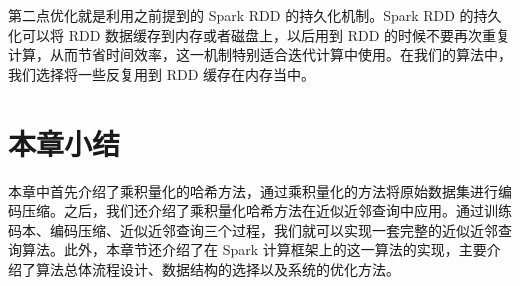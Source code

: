 第二点优化就是利用之前提到的 Spark RDD 的持久化机制。Spark RDD 的持久化可以将 RDD 数据缓存到内存或者磁盘上，以后用到 RDD 的时候不要再次重复计算，从而节省时间效率，这一机制特别适合迭代计算中使用。在我们的算法中，我们选择将一些反复用到 RDD 缓存在内存当中。
\section{本章小结}
本章中首先介绍了乘积量化的哈希方法，通过乘积量化的方法将原始数据集进行编码压缩。之后，我们还介绍了乘积量化哈希方法在近似近邻查询中应用。通过训练码本、编码压缩、近似近邻查询三个过程，我们就可以实现一套完整的近似近邻查询算法。此外，本章节还介绍了在 Spark 计算框架上的这一算法的实现，主要介绍了算法总体流程设计、数据结构的选择以及系统的优化方法。


